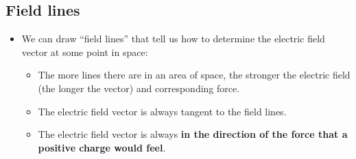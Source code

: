 \documentclass[aspectratio=169,
hyperref={colorlinks,urlcolor=blue}
]{beamer}
\begin{document}
\subsection{Field lines}
\label{subsec:fieldlines}
{
\begin{itemize}
\item We can draw ``field lines'' that tell us how to determine the electric field vector at some point in space:
\begin{itemize}
\item The more lines there are in an area of space, the stronger the electric field (the longer the vector) and corresponding force.
\item The electric field vector is always tangent to the field lines.
\item The electric field vector is always \textbf{in the direction of the force that a positive charge would feel}.
\end{itemize}
\end{itemize}
}
\end{document}
